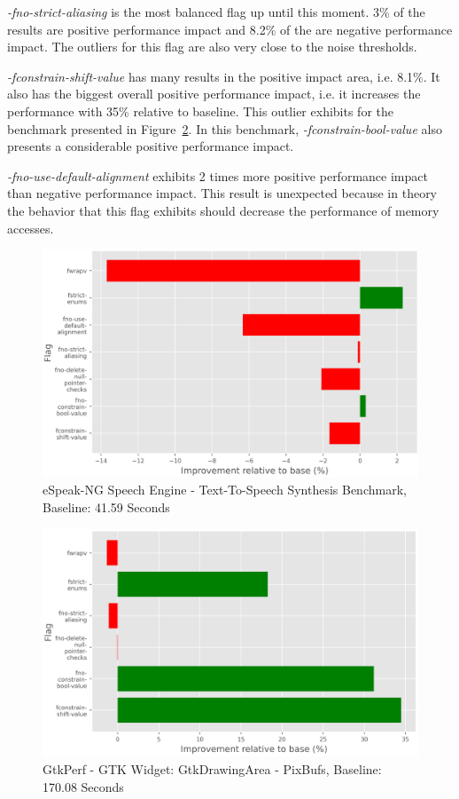 \textit{-fno-strict-aliasing} is the most balanced flag up until this moment.
3\% of the results are positive performance impact and 8.2\% of the are negative
performance impact. The outliers for this flag are also very close to the noise
thresholds.

\textit{-fconstrain-shift-value} has many results in the positive impact area,
i.e. 8.1\%. It also has the biggest overall positive performance impact, i.e.
it increases the performance with 35\% relative to baseline. This outlier
exhibits for the benchmark presented in Figure~\ref{fig:gtkperf}. In this
benchmark, \textit{-fconstrain-bool-value} also presents a considerable positive
performance impact.

\textit{-fno-use-default-alignment} exhibits 2 times more positive performance
impact than negative performance impact. This result is unexpected because in
theory the behavior that this flag exhibits should decrease the performance of
memory accesses.

\begin{figure}[H]
\includegraphics[scale=0.8]{espeak}
\caption{eSpeak-NG Speech Engine - Text-To-Speech Synthesis Benchmark, Baseline:
41.59 Seconds}
\label{fig:espeak}
\end{figure}

\begin{figure}[H]
\includegraphics[scale=0.8]{gtkperf}
\caption{GtkPerf - GTK Widget: GtkDrawingArea - PixBufs, Baseline: 170.08
Seconds}
\label{fig:gtkperf}
\end{figure}

